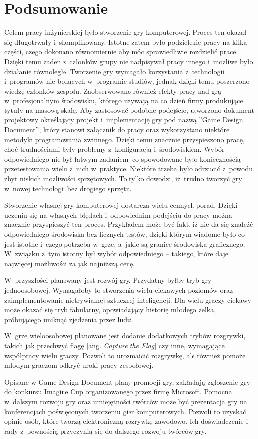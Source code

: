 \chapter{Podsumowanie}

Celem pracy inżynierskiej było stworzenie gry komputerowej. Proces ten okazał się długotrwały i~skomplikowany. Istotne zatem było podzielenie pracy na kilka części, czego dokonano równomiernie aby móc sprawiedliwie rozdzielić prace. Dzięki temu żaden z~członków grupy nie nadpisywał pracy innego i~możliwe było działanie równoległe. Tworzenie gry wymagało korzystania z~technologii i~programów nie będących w~programie studiów, jednak dzięki temu poszerzono wiedzę członków zespołu. Zaobserwowano również efekty pracy nad grą w~profesjonalnym środowisku, którego używają na co dzień firmy produkujące tytuły na masową skalę. Aby zastosować podobne podejście, utworzono dokument projektowy określający projekt i~implementację gry pod nazwą ''Game Design Document'', który stanowi załącznik do pracy oraz wykorzystano niektóre metodyki programowania zwinnego. Dzięki temu znacznie przyspieszono pracę, choć trudnościami były problemy z~konfiguracją i~środowiskiem. Wybór odpowiedniego nie był łatwym zadaniem, co spowodowane było koniecznością przetestowania wielu z~nich w~praktyce. Niektóre trzeba było odrzucić z~powodu zbyt niskich możliwości sprzętowych. To tylko dowodzi, iż~trudno tworzyć gry w~nowej technologii bez drogiego sprzętu.

Stworzenie własnej gry komputerowej dostarcza wielu cennych porad. Dzięki uczeniu się na własnych błędach i~odpowiednim podejściu do pracy można znacznie przyspieszyć ten proces. Przykładem może być fakt, iż nie da się znaleźć odpowiedniego środowiska bez licznych testów, dzięki którym wiadome było co jest istotne i~czego potrzeba w~grze, a~jakie są granice środowiska graficznego. W~związku z~tym istotny był wybór odpowiedniego -- takiego, które daje najwięcej możliwości za jak najniższą cenę.

W~przyszłości planowany jest rozwój gry. Przydatny byłby tryb gry jednoosobowej. Wymagałoby to stworzenia wielu ciekawych poziomów oraz zaimplementowanie nietrywialnej sztucznej inteligencji.  Dla wielu graczy ciekawy może okazać się tryb fabularny, opowiadający historię młodego żelka, próbującego uniknąć zjedzenia przez ludzi.

W~grze wieloosobowej planowane jest dodanie dodatkowych trybów rozgrywki, takich jak przechwyć flagę [ang. \emph{Capture the Flag}] czy inne, wymagające współpracy wielu graczy. Pozwoli to urozmaicić rozgrywkę, ale również pomoże młodym graczom odkryć uroki pracy zespołowej.

Opisane w Game Design Document plany promocji gry, zakładają zgłoszenie gry do konkursu Imagine Cup organizowanego przez firmę Microsoft. Pomocna w~dalszym rozwoju gry oraz umiejętności twórców może być prezentacja gry na konferencjach poświęconych tworzeniu gier komputerowych. Pozwoli to uzyskać opinie osób, które tworzą elektroniczną rozrywkę zawodowo. Ich doświadczenie i rady z~pewnością przyczynią się do dalszego rozwoju twórców gry.